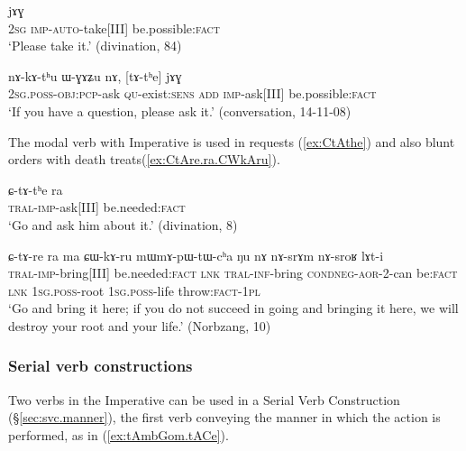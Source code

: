 \begin{exe}
\ex  \label{ex:tAnWndAm.jAG}
 jɤɣ \\
\textsc{2sg} \textsc{imp}-\textsc{auto}-take[III] be.possible:\textsc{fact} \\
\glt `Please take it.' (divination, 84)
\end{exe}

\begin{exe}
\ex  \label{ex:tAthe.jAG}
\gll nɤ-kɤ-tʰu ɯ-ɣɤʑu nɤ, [tɤ-tʰe] jɤɣ \\
\textsc{2sg}.\textsc{poss}-\textsc{obj}:\textsc{pcp}-ask \textsc{qu}-exist:\textsc{sens} \textsc{add} \textsc{imp}-ask[III] be.possible:\textsc{fact} \\
\glt `If you have a question, please ask it.' (conversation, 14-11-08)
\end{exe}

The modal verb  with Imperative is used in requests (\ref{ex:CtAthe}) and also blunt orders with death treats(\ref{ex:CtAre.ra.CWkAru}).

\begin{exe}
\ex \label{ex:CtAthe} 
\gll ɕ-tɤ-tʰe ra \\
\textsc{tral}-\textsc{imp}-ask[III] be.needed:\textsc{fact} \\
\glt `Go and ask him about it.' (divination, 8)
\end{exe}

\begin{exe}
\ex \label{ex:CtAre.ra.CWkAru}
\gll  ɕ-tɤ-re ra ma ɕɯ-kɤ-ru mɯ\redp{}mɤ-pɯ-tɯ-cʰa ŋu nɤ nɤ-srɤm nɤ-sroʁ lɤt-i \\
\textsc{tral}-\textsc{imp}-bring[III] be.needed:\textsc{fact} \textsc{lnk} \textsc{tral}-\textsc{inf}-bring \textsc{cond}\redp{}\textsc{neg}-\textsc{aor}-2-can be:\textsc{fact} \textsc{lnk} \textsc{1sg}.\textsc{poss}-root \textsc{1sg}.\textsc{poss}-life throw:\textsc{fact}-\textsc{1pl} \\ 
\glt `Go and bring it here; if you do not succeed in going and bringing it here, we will destroy your root and your life.' (Norbzang, 10)
\end{exe}


\subsubsection{Serial verb constructions} \label{sec:imp.SVC}
Two verbs in the Imperative can be used in a Serial Verb Construction (§\ref{sec:svc.manner}), the first verb conveying the manner in which the action is performed, as in (\ref{ex:tAmbGom.tACe}).

